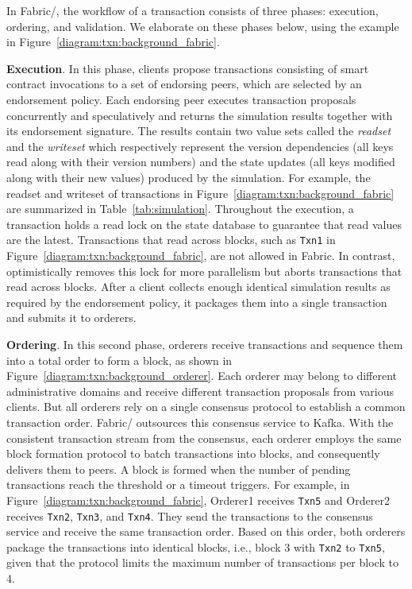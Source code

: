 In Fabric/{\fabricPlusplus}, the workflow of a transaction consists of three phases:
execution, ordering, and validation.
%
We elaborate on these phases below, using the example in
Figure~\ref{diagram:txn:background_fabric}.

\textbf{Execution}. In this phase, clients propose transactions
  consisting of smart contract invocations to a set of endorsing peers,
  which are selected by an endorsement policy.
  Each endorsing peer executes transaction proposals concurrently and
  speculatively and returns the simulation results together with its endorsement
  signature.
  The results contain two value sets called the \textit{readset} and the
  \textit{writeset} which respectively represent the version dependencies (all
  keys read along with their version numbers) and the state updates (all keys
  modified along with their new values) produced by the simulation.
  For example, the readset and writeset of transactions in
  Figure~\ref{diagram:txn:background_fabric} are summarized in Table~\ref{tab:simulation}.
  Throughout the execution, a transaction holds a read lock on the
  state database to guarantee that read values are the latest.
  Transactions that read across blocks, such as \texttt{Txn1} in
  Figure~\ref{diagram:txn:background_fabric}, are not allowed in Fabric.
  In contrast, {\fabricPlusplus} optimistically removes this lock for more parallelism but aborts transactions that read across blocks.
  After a client collects enough identical simulation results as required
  by the endorsement policy, it packages them into a single transaction and
  submits it to orderers.

\textbf{Ordering}. In this second phase, orderers receive
  transactions and sequence them into a total order to form a block, 
  as shown in Figure~\ref{diagram:txn:background_orderer}.
  Each orderer may belong to different administrative domains and receive different transaction proposals from various clients. 
  But all orderers rely on a single consensus protocol to establish a common transaction order.
  Fabric/{\fabricPlusplus} outsources this consensus service to Kafka. 
  With the consistent transaction stream from the consensus, each orderer employs the same block formation protocol to batch transactions into blocks, and consequently delivers them to peers.  
  A block is formed when the number of pending transactions reach the threshold or a timeout triggers. 
  For example, in Figure~\ref{diagram:txn:background_fabric}, Orderer1 receives \texttt{Txn5} and Orderer2 receives \texttt{Txn2},  \texttt{Txn3}, and \texttt{Txn4}. 
  They send the transactions to the consensus service and receive the same transaction order. 
  Based on this order, both orderers package the transactions into identical blocks, i.e., block 3 with  \texttt{Txn2} to  \texttt{Txn5}, given that the protocol limits the maximum number of transactions per block to 4. 
  

